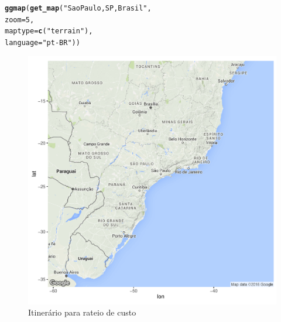 \documentclass[
	article,			        %
	11pt,				          %
	oneside,			        %
	a4paper,			        %
	english,			        %
	brazil,				        %
	sumario=tradicional
]{abntex2}\usepackage[]{graphicx}\usepackage[]{color}
\makeatletter
\def\maxwidth{ %
  \ifdim\Gin@nat@width>\linewidth
    \linewidth
  \else
    \Gin@nat@width
  \fi
}
\newcommand{\hlnum}[1]{\textcolor[rgb]{0.686,0.059,0.569}{#1}}%
\newcommand{\hlstr}[1]{\textcolor[rgb]{0.192,0.494,0.8}{#1}}%
\newcommand{\hlstd}[1]{\textcolor[rgb]{0.345,0.345,0.345}{#1}}%
\newcommand{\hlkwc}[1]{\textcolor[rgb]{0.333,0.667,0.333}{#1}}%
\newcommand{\hlkwd}[1]{\textcolor[rgb]{0.737,0.353,0.396}{\textbf{#1}}}%
\newenvironment{kframe}{%
 \def\at@end@of@kframe{}%
 \ifinner\ifhmode%
  \def\at@end@of@kframe{\end{minipage}}%
  \begin{minipage}{\columnwidth}%
 \fi\fi%
 \def\FrameCommand##1{\hskip\@totalleftmargin \hskip-\fboxsep
 \colorbox{shadecolor}{##1}\hskip-\fboxsep
     \hskip-\linewidth \hskip-\@totalleftmargin \hskip\columnwidth}%
 \MakeFramed {\advance\hsize-\width
   \@totalleftmargin\z@ \linewidth\hsize
   \@setminipage}}%
 {\par\unskip\endMakeFramed%
 \at@end@of@kframe}
\newenvironment{knitrout}{}{} %
\makeatother
\begin{document}
\begin{knitrout}
\color{fgcolor}\begin{kframe}
\begin{alltt}
\hlkwd{ggmap}\hlstd{(}\hlkwd{get_map}\hlstd{(}\hlstr{"Sao Paulo, SP, Brasil"}\hlstd{,}
              \hlkwc{zoom} \hlstd{=} \hlnum{5}\hlstd{,}
              \hlkwc{maptype} \hlstd{=} \hlkwd{c}\hlstd{(}\hlstr{"terrain"}\hlstd{),}
              \hlkwc{language} \hlstd{=} \hlstr{"pt-BR"}\hlstd{))}
\end{alltt}
\end{kframe}\begin{figure}

{\centering \includegraphics[width=\maxwidth]{figure/unnamed-chunk-3-1} 

}

\caption[Itinerário para rateio de custo]{Itinerário para rateio de custo}\label{fig:unnamed-chunk-3}
\end{figure}


\end{knitrout}
\end{document}
